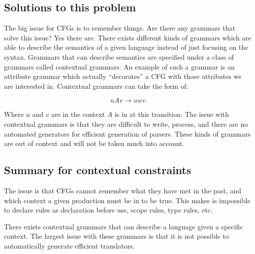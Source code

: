\subsection{Solutions to this problem}
The big issue for CFGs is to remember things. Are there any grammars
that solve this issue? Yes there are. There exists different kinds of
grammars which are able to describe the semantics of a given language
instead of just focusing on the syntax. Grammars that can describe
semantics are specified under a class of grammars called contextual
grammars. \cite{plpp} An example of such a grammar is an attribute
grammar which actually ``decorates'' a CFG with those attributes we are
interested in. \cite{attrgrammar} 
Contextual grammars can take the form of:

\[
  uAv \rightarrow uwv
\]

Where $u$ and $v$ are in the context $A$ is in at this transition. The
issue with contextual grammars is that they are difficult to write,
process, and there are no automated generators for efficient generation
of parsers. These kinds of grammars are out of context and will not be
taken much into account.

\cite{attrgrammar}

\subsection{Summary for contextual constraints}
The issue is that CFGs cannot remember what they have met in the past, and
which context a given production must be in to be true. This makes is impossible
to declare rules as declaration before use, scope rules, type rules, etc.

There exists contextual grammars that can describe a language given a specific
context. The largest issue with these grammars is that it is not possible to
automatically generate efficient translators.
